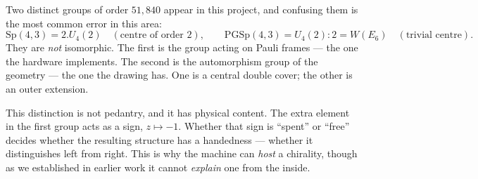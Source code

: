 \begin{spec}
Two distinct groups of order $51{,}840$ appear in this project, and confusing them is the
most common error in this area:
\[
  \mathrm{Sp}(4,3)=2.U_4(2)\quad(\text{centre of order }2),\qquad
  \mathrm{PGSp}(4,3)=U_4(2){:}2=W(E_6)\quad(\text{trivial centre}).
\]
They are \emph{not} isomorphic. The first is the group acting on Pauli frames --- the one
the hardware implements. The second is the automorphism group of the geometry --- the one
the drawing has. One is a central double cover; the other is an outer extension.
\end{spec}

\begin{plain}
This distinction is not pedantry, and it has physical content. The extra element in the
first group acts as a sign, $z\mapsto -1$. Whether that sign is ``spent'' or ``free''
decides whether the resulting structure has a handedness --- whether it distinguishes
left from right. This is why the machine can \emph{host} a chirality, though as we
established in earlier work it cannot \emph{explain} one from the inside.
\end{plain}

